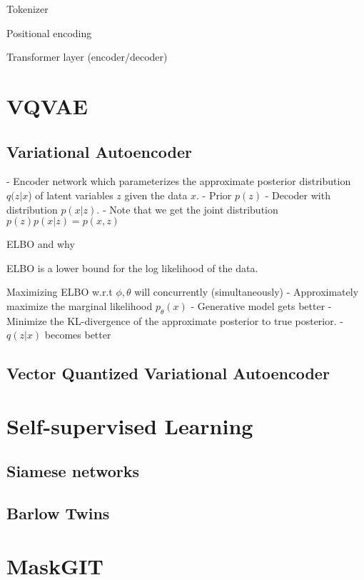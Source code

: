 \documentclass[../../thesis.tex]{subfiles}
\begin{document}
Tokenizer

Positional encoding


Transformer layer (encoder/decoder)



\section{VQVAE}

\subsection{Variational Autoencoder}


- Encoder network which parameterizes the approximate posterior distribution $q(z|x$) of latent variables $z$ given the data $x$.
- Prior $p(z)$
- Decoder with distribution $p(x|z)$. 
- Note that we get the joint distribution $p(z)p(x|z) = p(x,z)$

ELBO and why

ELBO is a lower bound for the log likelihood of the data.

Maximizing ELBO w.r.t $\phi, \theta$  will concurrently (simultaneously)
- Approximately maximize the marginal likelihood $p_\theta(x)$ 
	- Generative model gets better
- Minimize the KL-divergence of the approximate posterior to true posterior. 
	- $q(z|x)$ becomes better

\subsection{Vector Quantized Variational Autoencoder}


\section{Self-supervised Learning}
\subsection{Siamese networks}
\subsection{Barlow Twins}

\section{MaskGIT}
\end{document}
